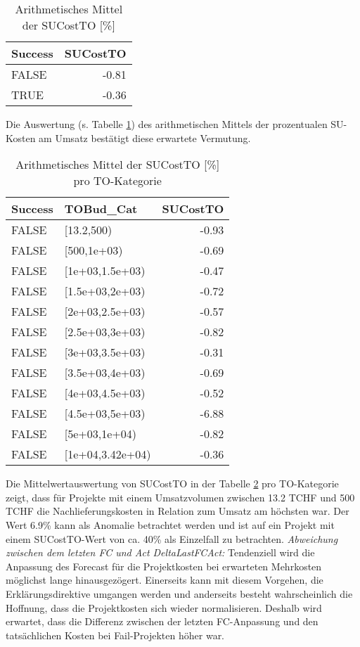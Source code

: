 \begin{table}[H]
	\centering
	\caption{Arithmetisches Mittel der SUCostTO [\%]}
	\begin{tabular}{lr}
		\textbf{Success} & \multicolumn{1}{l}{\textbf{SUCostTO}} \\\hline
		FALSE & -0.81 \\
		TRUE  & -0.36 \\
	\end{tabular}%
	\label{msu}%
\end{table}%
Die Auswertung (s. Tabelle \ref{msu}) des arithmetischen Mittels der prozentualen SU-Kosten am Umsatz bestätigt diese erwartete Vermutung.
\begin{table}[H]
	\centering
	\caption{Arithmetisches Mittel der SUCostTO [\%] pro TO-Kategorie}
	\begin{tabular}{llr}
		\textbf{Success} & \textbf{TOBud\_Cat} & \multicolumn{1}{l}{\textbf{SUCostTO}} \\\hline
		FALSE & [13.2,500) & -0.93 \\
		FALSE & [500,1e+03) & -0.69 \\
		FALSE & [1e+03,1.5e+03) & -0.47 \\
		FALSE & [1.5e+03,2e+03) & -0.72 \\
		FALSE & [2e+03,2.5e+03) & -0.57 \\		
		FALSE & [2.5e+03,3e+03) & -0.82 \\
		FALSE & [3e+03,3.5e+03) & -0.31 \\
		FALSE & [3.5e+03,4e+03) & -0.69 \\
		FALSE & [4e+03,4.5e+03) & -0.52 \\
		FALSE & [4.5e+03,5e+03) & -6.88 \\
		FALSE & [5e+03,1e+04) & -0.82 \\
		FALSE & [1e+04,3.42e+04) & -0.36 \\
	\end{tabular}%
	\label{msutocat}%
\end{table}%
Die Mittelwertauswertung von SUCostTO in der Tabelle \ref{msutocat} pro TO-Kategorie zeigt, dass für Projekte mit einem Umsatzvolumen zwischen 13.2 TCHF und 500 TCHF die Nachlieferungskosten in Relation zum Umsatz am höchsten war. Der Wert 6.9\% kann als Anomalie betrachtet werden und ist auf ein Projekt mit einem SUCostTO-Wert von ca. 40\% als Einzelfall zu betrachten.
%
%
\newline\newline\textit{Abweichung zwischen dem letzten FC und Act DeltaLastFCAct:} Tendenziell wird die Anpassung des Forecast für die Projektkosten bei erwarteten Mehrkosten möglichst lange hinausgezögert. Einerseits kann mit diesem Vorgehen, die Erklärungsdirektive umgangen werden und anderseits besteht wahrscheinlich die Hoffnung, dass die Projektkosten sich wieder normalisieren. Deshalb wird erwartet, dass die Differenz zwischen der letzten FC-Anpassung und den tatsächlichen Kosten bei Fail-Projekten höher war. 
